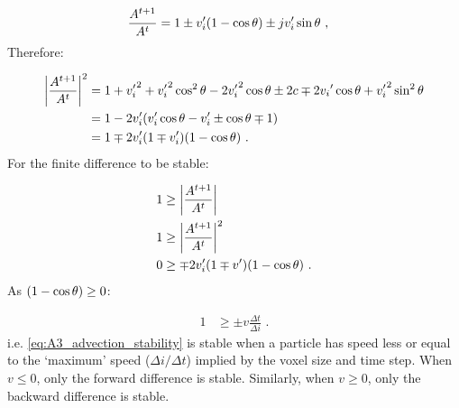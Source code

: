 \begin{equation}
    \begin{aligned}
    \frac{A^{t+1}}{A^t}&=1\pm v'_i\qty(1-\cos\theta)\pm jv'_i\sin\theta\text{ ,} 
    \end{aligned}
\end{equation}
\noindent Therefore:

\begin{equation}
    \begin{aligned}
    \bigg| \frac{A^{t+1}}{A^t} \bigg|^2&=1+{v'_i}^2+{v'_i}^2\cos^2\theta - 2{v'_i}^2\cos\theta \pm 2c \mp 2{v_i}'\cos\theta + {v'_i}^2\sin^2\theta \\
    &=1-2v'_i\qty(v'_i\cos\theta -v'_i\pm \cos\theta \mp 1) \\
    &=1\mp 2v'_i\qty(1\mp v'_i)\qty(1-\cos\theta)\text{ .} 
    \end{aligned}
\end{equation}
\noindent For the finite difference to be stable:

\begin{equation}
    \begin{aligned}
    1&\geq \bigg| \frac{A^{t+1}}{A^t} \bigg|\\
    1&\geq\bigg| \frac{A^{t+1}}{A^t} \bigg|^2\\
    0&\geq \mp 2v'_i\qty(1\mp v')\qty(1-\cos\theta)\text{ .} 
    \end{aligned}
\end{equation}
\noindent As $\qty(1-\cos\theta)\geq 0$:

\begin{equation}
    \begin{aligned}
    1&\geq \pm v\frac{\Delta t}{\Delta i}\text{ .} 
    \end{aligned} \label{eq:A3_advection_stability}
\end{equation}
\noindent i.e. \autoref{eq:A3_advection_stability} is stable when a particle has speed less or equal to the `maximum' speed ($\Delta i/\Delta t$) implied by the voxel size and time step. When $v\leq 0$, only the forward difference is stable. Similarly, when $v\geq 0$, only the backward difference is stable.